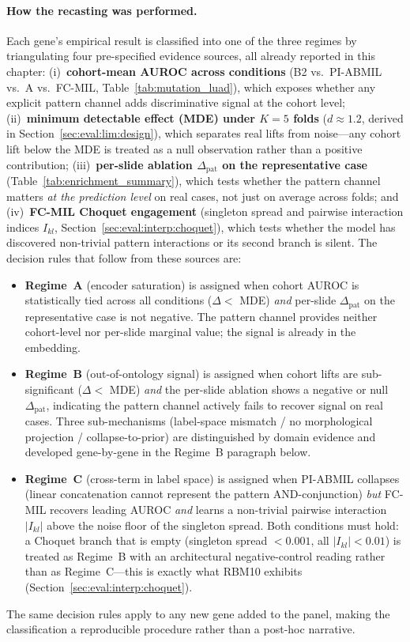 \paragraph{How the recasting was performed.}
\label{par:eval:regime_decision_rules}
Each gene's empirical result is classified into one of the three
regimes by triangulating four pre-specified evidence sources, all
already reported in this chapter:
(i)~\textbf{cohort-mean AUROC across conditions}
(B2 vs.\ PI-ABMIL vs.\ A vs.\ FC-MIL,
Table~\ref{tab:mutation_luad}),
which exposes whether any explicit pattern channel adds discriminative
signal at the cohort level;
(ii)~\textbf{minimum detectable effect (MDE) under $K=5$ folds}
($d \approx 1.2$, derived in
Section~\ref{sec:eval:lim:design}), which separates real lifts from
noise---any cohort lift below the MDE is treated as a null observation
rather than a positive contribution;
(iii)~\textbf{per-slide ablation $\Delta_{\mathrm{pat}}$ on the
representative case} (Table~\ref{tab:enrichment_summary}), which tests
whether the pattern channel matters \emph{at the prediction level} on
real cases, not just on average across folds;
and (iv)~\textbf{FC-MIL Choquet engagement}
(singleton spread and pairwise interaction indices
$I_{kl}$, Section~\ref{sec:eval:interp:choquet}), which tests
whether the model has discovered non-trivial pattern interactions or
its second branch is silent.
The decision rules that follow from these sources are:
\begin{itemize}
  \item \textbf{Regime~A} (encoder saturation) is assigned when
  cohort AUROC is statistically tied across all conditions
  ($\Delta < $ MDE) \emph{and} per-slide $\Delta_{\mathrm{pat}}$ on
  the representative case is not negative.
  The pattern channel provides neither cohort-level nor per-slide
  marginal value; the signal is already in the embedding.
  \item \textbf{Regime~B} (out-of-ontology signal) is assigned when
  cohort lifts are sub-significant ($\Delta < $ MDE) \emph{and} the
  per-slide ablation shows a negative or null
  $\Delta_{\mathrm{pat}}$, indicating the pattern channel actively
  fails to recover signal on real cases.
  Three sub-mechanisms (label-space mismatch / no morphological
  projection / collapse-to-prior) are distinguished by domain
  evidence and developed gene-by-gene in the Regime~B paragraph
  below.
  \item \textbf{Regime~C} (cross-term in label space) is assigned
  when PI-ABMIL collapses (linear concatenation cannot represent the
  pattern AND-conjunction) \emph{but} FC-MIL recovers leading AUROC
  \emph{and} learns a non-trivial pairwise interaction
  $|I_{kl}|$ above the noise floor of the singleton spread.
  Both conditions must hold: a Choquet branch that is empty
  (singleton spread $< 0.001$, all $|I_{kl}| < 0.01$) is treated as
  Regime~B with an architectural negative-control reading rather
  than as Regime~C---this is exactly what RBM10 exhibits
  (Section~\ref{sec:eval:interp:choquet}).
\end{itemize}
The same decision rules apply to any new gene added to the panel,
making the classification a reproducible procedure rather than a
post-hoc narrative.


